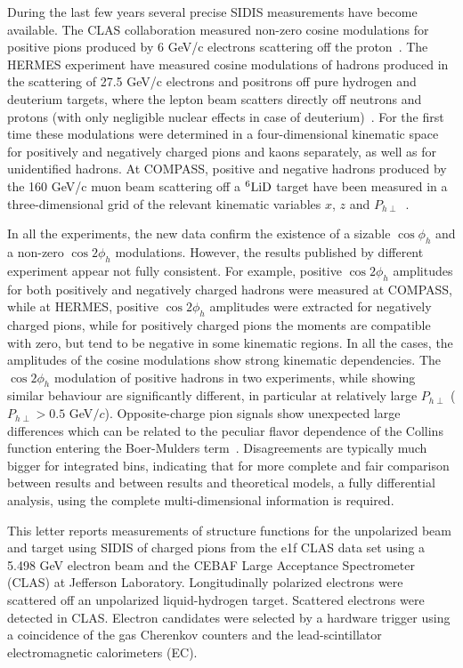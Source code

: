 \documentclass[aps,prl,twocolumn,showpacs,superscriptaddress,groupedaddress]{revtex4-1}  %
\newcommand{\Phperp}{P_{h\perp}}
\begin{document}
During the last few years several precise SIDIS measurements have become available. The CLAS
collaboration measured non-zero cosine modulations for positive pions produced
by 6 GeV/c electrons scattering off the proton~\cite{Osipenko:2008rv}.  The
HERMES experiment have measured cosine modulations of hadrons produced in the
scattering of 27.5 GeV/c electrons and positrons off pure hydrogen and deuterium
targets, where the lepton beam scatters directly off neutrons and protons (with
only negligible nuclear effects in case of
deuterium)~\cite{Airapetian:2012yg}. For the first time these modulations were
determined in a four-dimensional kinematic space for positively and negatively
charged pions and kaons separately, as well as for unidentified hadrons. At
COMPASS, positive and negative hadrons produced by the 160 GeV/c muon beam
scattering off a $\rm ^6LiD$ target have been measured in a three-dimensional
grid of the relevant kinematic variables $x$, $z$ and
$\Phperp$~\cite{Adolph:2014pwc}.

In all the experiments, the new data confirm the existence of a sizable
$\cos\phi_h$ and a non-zero $\cos2\phi_h$ modulations.  However, the results
published by different experiment appear not fully consistent. For example,
positive $\cos2\phi_h$ amplitudes for both positively and negatively charged
hadrons were measured at COMPASS, while at HERMES, positive $\cos 2\phi_h$ amplitudes
were extracted for negatively charged pions, while for positively charged pions
the moments are compatible with zero, but tend to be negative in some kinematic
regions. In all the cases, the amplitudes of the cosine modulations show strong
kinematic dependencies. 
The $\cos2\phi_h$ modulation of positive hadrons in two experiments, while showing similar behaviour are significantly different, in particular at relatively large $\Phperp$  ($\Phperp>0.5$ GeV$/c$).
Opposite-charge pion signals show unexpected large differences which can be related to the peculiar flavor dependence of the Collins function entering the Boer-Mulders term~\cite{Airapetian:2012yg}. Disagreements are typically much bigger for integrated bins, indicating that for 
more complete and fair comparison between results and between results
and theoretical models, a fully differential analysis, using the complete
multi-dimensional information is required.


This letter reports measurements of structure functions for the unpolarized beam and target using SIDIS of charged pions from the e1f CLAS data set 
using a 5.498 GeV electron beam and the CEBAF Large Acceptance 
Spectro\-meter (CLAS) \cite{Mecking:2003zu} at Jefferson Laboratory.
Longitudinally polarized electrons were scattered off
an unpolarized liquid-hydrogen target. 
Scattered electrons were detected in CLAS.
Electron candidates were selected by a hardware trigger using a 
coincidence of the gas Cherenkov counters and the lead-scintillator electromagnetic calorimeters (EC). 
\end{document}
